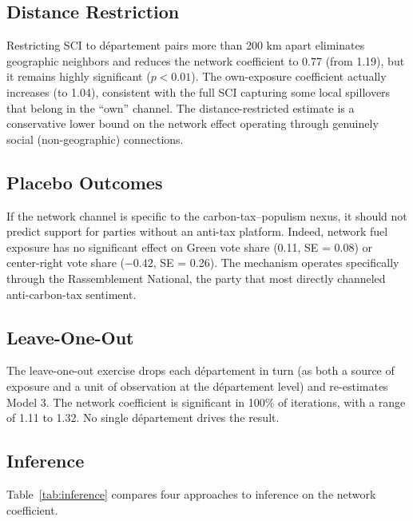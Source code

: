 \documentclass[12pt]{article}
\newcommand{\rn}{Rassemblement National}
\newcommand{\dept}{d\'{e}partement}
\begin{document}
\subsection{Distance Restriction}

Restricting SCI to \dept{} pairs more than 200 km apart eliminates geographic neighbors and reduces the network coefficient to 0.77 (from 1.19), but it remains highly significant ($p < 0.01$). The own-exposure coefficient actually increases (to 1.04), consistent with the full SCI capturing some local spillovers that belong in the ``own'' channel. The distance-restricted estimate is a conservative lower bound on the network effect operating through genuinely social (non-geographic) connections.

\subsection{Placebo Outcomes}

If the network channel is specific to the carbon-tax--populism nexus, it should not predict support for parties without an anti-tax platform. Indeed, network fuel exposure has no significant effect on Green vote share (0.11, SE = 0.08) or center-right vote share ($-0.42$, SE = 0.26). The mechanism operates specifically through the \rn{}, the party that most directly channeled anti-carbon-tax sentiment.

\subsection{Leave-One-Out}

The leave-one-out exercise drops each \dept{} in turn (as both a source of exposure and a unit of observation at the \dept{} level) and re-estimates Model 3. The network coefficient is significant in 100\% of iterations, with a range of 1.11 to 1.32. No single \dept{} drives the result.

\subsection{Inference}

Table~\ref{tab:inference} compares four approaches to inference on the network coefficient.
\end{document}
